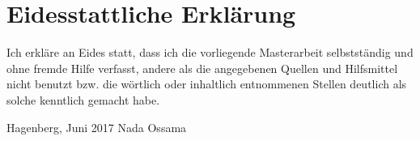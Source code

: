 \chapter*{Eidesstattliche Erkl\"arung}
\thispagestyle{empty}

Ich erkl\"are an Eides statt, dass ich die vorliegende Masterarbeit selbstst\"andig und ohne fremde Hilfe verfasst, andere als die angegebenen Quellen und Hilfsmittel nicht benutzt bzw. die w\"ortlich oder inhaltlich entnommenen Stellen deutlich als solche kenntlich gemacht habe.

Hagenberg, Juni 2017
\hfill Nada Ossama
